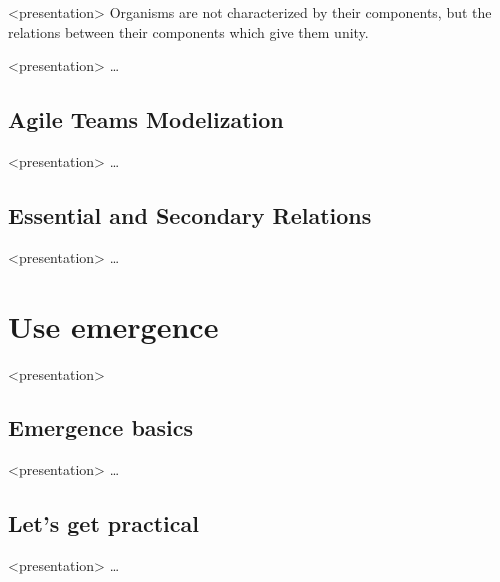   \begin{frame}<presentation>%
    Organisms are not characterized by their components, but the \alert{relations} between their components which give them \alert{unity}.
  \end{frame}

  \begin{frame}<presentation>%
    \dots
  \end{frame}

%
\subsection{Agile Teams Modelization}

  \begin{frame}<presentation>%
    \dots
  \end{frame}

%
\subsection{Essential and Secondary Relations}

  \begin{frame}<presentation>%
    \dots
  \end{frame}

\section{Use emergence}

  \begin{frame}<presentation>
    \tableofcontents[currentsection]
  \end{frame}

%
\subsection{Emergence basics}

  \begin{frame}<presentation>%
    \dots
  \end{frame}

%
\subsection{Let's get practical}

  \begin{frame}<presentation>%
    \dots
  \end{frame}

